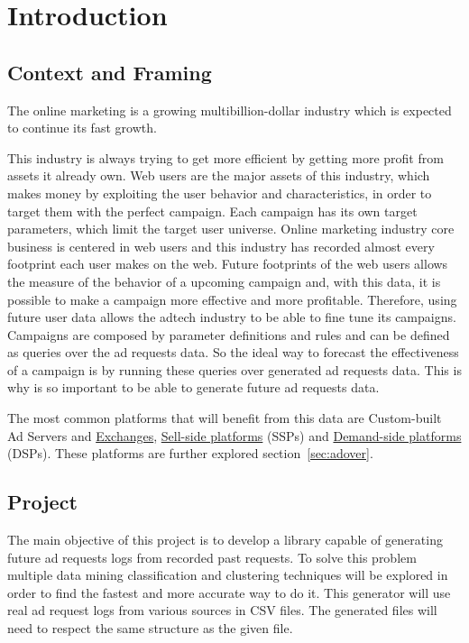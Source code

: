 \chapter{Introduction} \label{chap:intro}


\section{Context and Framing} \label{sec:context}

The online marketing is a growing multibillion-dollar industry \cite{PricewaterhouseCoopers2013}
which is expected to continue its fast growth.\cite{PricewaterhouseCoopers2013a}

This industry is always trying to get more efficient by getting more profit from assets it already own. 
Web users are the major assets of this industry, which makes money by exploiting the user behavior and characteristics, in order to target them with the
perfect campaign. Each campaign has its own target parameters, which limit the target user universe.
Online marketing industry core business is centered in web users and this industry has recorded almost every footprint each user makes on the web.
Future footprints of the web users allows the measure of the behavior of a upcoming campaign and, with this data, it is possible to make a campaign more
effective and more profitable. Therefore, using future user data allows the adtech industry to be able to fine tune its campaigns. 
Campaigns are composed by parameter definitions and rules and can be defined as
queries over the ad requests data. So the ideal way to forecast the effectiveness
of a campaign is by running these queries over generated ad requests data. This
is why is so important to be able to generate future ad requests data.

The most common platforms that will benefit from this data are Custom-built Ad
Servers and \hyperref[itm:adex]{Exchanges}, \hyperref[itm:ssp]{Sell-side platforms} (SSPs) and
\hyperref[itm:dsp]{Demand-side platforms}
(DSPs). These platforms are further explored section~\ref{sec:adover}.


\section{Project} \label{sec:proj}

The main objective of this project is to develop a library capable of generating
future ad requests logs from recorded past requests.
To solve this problem multiple data mining classification and clustering
techniques will be explored in order to find the fastest and more accurate way
to do it. 
This generator will use real ad request logs from various sources in CSV files.
The generated files will need to respect the same structure as the given file.

